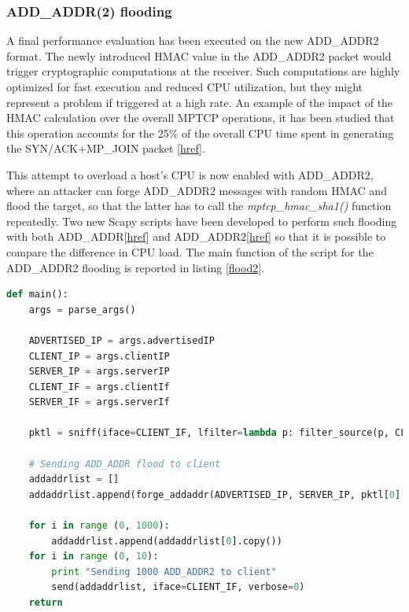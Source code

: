 \subsubsection{ADD\_ADDR(2) flooding}
A final performance evaluation has been executed on the new ADD\_ADDR2 format. The newly introduced HMAC value in the ADD\_ADDR2 packet would trigger cryptographic computations at the receiver. Such computations are highly optimized for fast execution and reduced CPU utilization, but they might represent a problem if triggered at a high rate. 
An example of the impact of the HMAC calculation over the overall MPTCP operations, it has been studied that this operation accounts for the 25\% of the overall CPU time spent in generating the SYN/ACK+MP\_JOIN packet [\href{http://inl.info.ucl.ac.be/system/files/phd-thesis_1.pdf}{href}].

This attempt to overload a host's CPU is now enabled with ADD\_ADDR2, where an attacker can forge ADD\_ADDR2 messages with random HMAC and flood the target, so that the latter has to call the \textit{mptcp\_hmac\_sha1()} function repeatedly. Two new Scapy scripts have been developed to perform such flooding with both ADD\_ADDR[\href{https://github.com/fabriziodemaria/MPTCP-Exploit/tree/add-addr-flood}{href}] and ADD\_ADDR2[\href{https://github.com/fabriziodemaria/MPTCP-Exploit/tree/add-addr-2-flood}{href}] so that it is possible to compare the difference in CPU load. The main function of the script for the ADD\_ADDR2 flooding is reported in listing \ref{flood2}.

\begin{lstlisting}[language=Python, caption=\textit{Scapy flooding tool}, label=flood2]
def main():
    args = parse_args()

    ADVERTISED_IP = args.advertisedIP
    CLIENT_IP = args.clientIP
    SERVER_IP = args.serverIP
    CLIENT_IF = args.clientIf
    SERVER_IF = args.serverIf

    pktl = sniff(iface=CLIENT_IF, lfilter=lambda p: filter_source(p, CLIENT_IP), count=1)

    # Sending ADD_ADDR flood to client
    addaddrlist = []
    addaddrlist.append(forge_addaddr(ADVERTISED_IP, SERVER_IP, pktl[0][TCP].dport, CLIENT_IP, pktl[0][TCP].sport, (pktl[0][TCP].ack)+SEQUENCE_OFFSET, (pktl[0][TCP].seq)-SEQUENCE_OFFSET))
    
    for i in range (0, 1000):
        addaddrlist.append(addaddrlist[0].copy())
    for i in range (0, 10):
        print "Sending 1000 ADD_ADDR2 to client"
        send(addaddrlist, iface=CLIENT_IF, verbose=0)
    return
\end{lstlisting}

